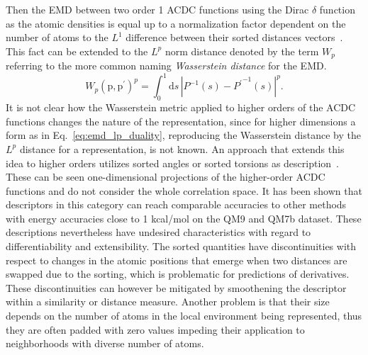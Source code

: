 Then the EMD between two order 1 ACDC functions using the Dirac $\delta$ function as the atomic densities is equal up to a normalization factor dependent on the number of atoms to the $L^1$ difference between their sorted distances vectors~\cite{will+19jcp}.
This fact can be extended to the $L^p$ norm distance denoted by the term $W_p$ referring to the more common naming \emph{Wasserstein distance} for the EMD.
\begin{equation}
  \label{eq:emd_lp_duality}
  W_p(\textrm{p}, \textrm{p}^\prime)^p=\int_0^1\mathrm{d}{s}\,\left|P^{-1}(s) -{P^{\prime}}^{-1}(s)\right|^p.
\end{equation}
It is not clear how the Wasserstein metric applied to higher orders of the ACDC functions changes the nature of the representation, since for higher dimensions a form as in Eq.~\eqref{eq:emd_lp_duality}, reproducing the Wasserstein distance by the $L^p$ distance for a representation, is not known.
An approach that extends this idea to higher orders utilizes sorted angles or sorted torsions as description~\cite{huang2016communication}.
These can be seen one-dimensional projections of the higher-order ACDC functions and do not consider the whole correlation space.
It has been shown that descriptors in this category can reach comparable accuracies to other methods~\cite{barker2016localized,huang2016communication} with energy accuracies close to 1 kcal/mol on the QM9 and QM7b dataset. %
These descriptions nevertheless have undesired characteristics with regard to differentiability and extensibility.
The sorted quantities have discontinuities with respect to changes in the atomic positions that emerge when two distances are swapped due to the sorting, which is problematic for predictions of derivatives.
These discontinuities can however be mitigated by smoothening the descriptor within a similarity or distance measure.
Another problem is that their size depends on the number of atoms in the local environment being represented, thus they are often padded with zero values impeding their application to neighborhoods with diverse number of atoms.

